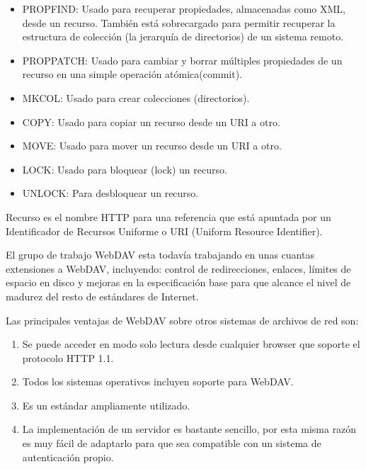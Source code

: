 \begin{itemize}

	\item PROPFIND: Usado para recuperar propiedades, almacenadas como XML, desde un recurso. También está sobrecargado para permitir recuperar la estructura de colección (la jerarquía de directorios) de un sistema remoto.
	
	\item PROPPATCH: Usado para cambiar y borrar múltiples propiedades de un recurso en una simple operación atómica(commit).
	
	\item MKCOL: Usado para crear colecciones (directorios).
	
	\item COPY: Usado para copiar un recurso desde un URI a otro.
	
	\item MOVE: Usado para mover un recurso desde un URI a otro.
	
	\item LOCK: Usado para bloquear (lock) un recurso.
	
	\item UNLOCK: Para desbloquear un recurso.

\end{itemize}

Recurso es el nombre HTTP para una referencia que está apuntada por un Identificador de Recursos Uniforme o URI (Uniform Resource Identifier).

El grupo de trabajo WebDAV esta todavía trabajando en unas cuantas extensiones a WebDAV, incluyendo: control de redirecciones, enlaces, límites de espacio en disco y mejoras en la especificación base para que alcance el nivel de madurez del resto de estándares de Internet.

Las principales ventajas de WebDAV sobre otros sistemas de archivos de red son:

\begin{enumerate}

	\item Se puede acceder en modo solo lectura desde cualquier browser que soporte el protocolo HTTP 1.1.
	
	\item Todos los sistemas operativos incluyen soporte para WebDAV.
	
	\item Es un estándar ampliamente utilizado.
	
	\item La implementación de un servidor es bastante sencillo, por esta misma razón es muy fácil de adaptarlo para que sea compatible con un sistema de autenticación propio.

\end{enumerate}


